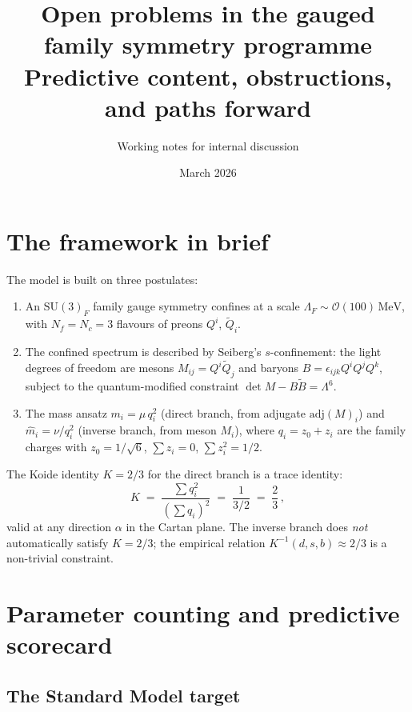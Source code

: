 \documentclass[12pt,a4paper]{article}
\title{Open problems in the gauged family symmetry programme\\[6pt]
  \large Predictive content, obstructions, and paths forward}
\author{Working notes for internal discussion}
\date{March 2026}
\newcommand{\SU}{\mathrm{SU}}
\newcommand{\Nf}{N_{\!f}}
\newcommand{\Nc}{N_{\!c}}
\newcommand{\adj}{\mathrm{adj}}
\newcommand{\MeV}{\,\mathrm{MeV}}
\begin{document}
\maketitle

\tableofcontents
\newpage

\section{The framework in brief}
\label{sec:framework}

The model is built on three postulates:
\begin{enumerate}[label=(\roman*)]
\item An $\SU(3)_F$ family gauge symmetry confines at a scale
  $\Lambda_F \sim \mathcal{O}(100)\MeV$, with $\Nf = \Nc = 3$
  flavours of preons $Q^i$, $\tilde{Q}_i$.

\item The confined spectrum is described by Seiberg's
  $s$-confinement: the light degrees of freedom are
  mesons $M_{ij} = Q^i \tilde{Q}_j$ and baryons
  $B = \epsilon_{ijk} Q^i Q^j Q^k$, subject to the
  quantum-modified constraint $\det M - B\tilde{B} = \Lambda^6$.

\item The mass ansatz $m_i = \mu\,q_i^2$ (direct branch, from
  adjugate $\adj(M)_i$) and $\hat{m}_i = \nu/q_i^2$ (inverse
  branch, from meson $M_i$), where
  $q_i = z_0 + z_i$ are the family charges with
  $z_0 = 1/\sqrt{6}$, $\sum z_i = 0$, $\sum z_i^2 = 1/2$.
\end{enumerate}

\noindent The Koide identity $K = 2/3$ for the direct branch is a trace
identity:
\begin{equation}
  K \;=\; \frac{\sum q_i^2}{(\sum q_i)^2}
  \;=\; \frac{1}{3/2} \;=\; \frac{2}{3}\,,
\end{equation}
valid at any direction $\alpha$ in the Cartan plane.  The inverse branch
does \emph{not} automatically satisfy $K = 2/3$; the empirical relation
$K^{-1}(d,s,b) \approx 2/3$ is a non-trivial constraint.

\section{Parameter counting and predictive scorecard}
\label{sec:scorecard}

\subsection{The Standard Model target}
\end{document}
